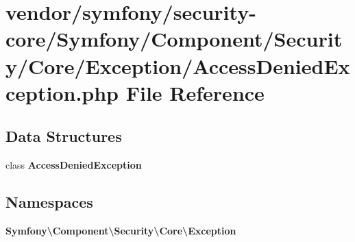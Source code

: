 \section{vendor/symfony/security-\/core/\+Symfony/\+Component/\+Security/\+Core/\+Exception/\+Access\+Denied\+Exception.php File Reference}
\label{security-core_2_symfony_2_component_2_security_2_core_2_exception_2_access_denied_exception_8php}
\subsection*{Data Structures}
\begin{DoxyCompactItemize}
\item 
class {\bf Access\+Denied\+Exception}
\end{DoxyCompactItemize}
\subsection*{Namespaces}
\begin{DoxyCompactItemize}
\item 
 {\bf Symfony\textbackslash{}\+Component\textbackslash{}\+Security\textbackslash{}\+Core\textbackslash{}\+Exception}
\end{DoxyCompactItemize}
